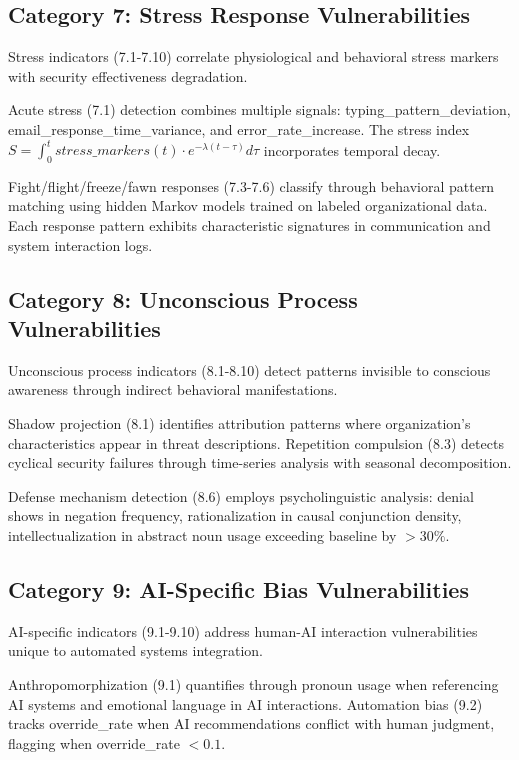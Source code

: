 \documentclass[10pt, twocolumn]{article}
\begin{document}
\subsection{Category 7: Stress Response Vulnerabilities}

Stress indicators (7.1-7.10) correlate physiological and behavioral stress markers with security effectiveness degradation.

Acute stress (7.1) detection combines multiple signals: typing\_pattern\_deviation, email\_response\_time\_variance, and error\_rate\_increase. The stress index $S = \int_0^t stress\_markers(t) \cdot e^{-\lambda(t-\tau)} d\tau$ incorporates temporal decay.

Fight/flight/freeze/fawn responses (7.3-7.6) classify through behavioral pattern matching using hidden Markov models trained on labeled organizational data. Each response pattern exhibits characteristic signatures in communication and system interaction logs.

\subsection{Category 8: Unconscious Process Vulnerabilities}

Unconscious process indicators (8.1-8.10) detect patterns invisible to conscious awareness through indirect behavioral manifestations.

Shadow projection (8.1) identifies attribution patterns where organization's characteristics appear in threat descriptions. Repetition compulsion (8.3) detects cyclical security failures through time-series analysis with seasonal decomposition.

Defense mechanism detection (8.6) employs psycholinguistic analysis: denial shows in negation frequency, rationalization in causal conjunction density, intellectualization in abstract noun usage exceeding baseline by $>30\%$.

\subsection{Category 9: AI-Specific Bias Vulnerabilities}

AI-specific indicators (9.1-9.10) address human-AI interaction vulnerabilities unique to automated systems integration.

Anthropomorphization (9.1) quantifies through pronoun usage when referencing AI systems and emotional language in AI interactions. Automation bias (9.2) tracks override\_rate when AI recommendations conflict with human judgment, flagging when override\_rate $< 0.1$.
\end{document}
